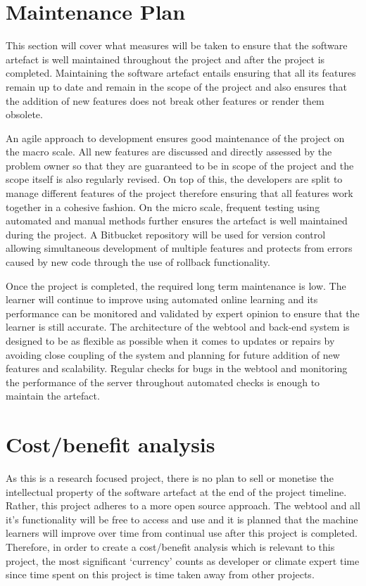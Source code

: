 \documentclass{ecmm427_assignment}
\begin{document}
\section{Maintenance Plan}
This section will cover what measures will be taken to ensure that the software artefact is well maintained throughout the project and after the project is completed. Maintaining the software artefact entails ensuring that all its features remain up to date and remain in the scope of the project and also ensures that the addition of new features does not break other features or render them obsolete.\par

An agile approach to development ensures good maintenance of the project on the macro scale. All new features are discussed and directly assessed by the problem owner so that they are guaranteed to be in scope of the project and the scope itself is also regularly revised. On top of this, the developers are split to manage different features of the project therefore ensuring that all features work together in a cohesive fashion. On the micro scale, frequent testing using automated and manual methods further ensures the artefact is well maintained during the project. A Bitbucket repository will be used for version control allowing simultaneous development of multiple features and protects from errors caused by new code through the use of rollback functionality.\par

Once the project is completed, the required long term maintenance is low. The learner will continue to improve using automated online learning and its performance can be monitored and validated by expert opinion to ensure that the learner is still accurate. The architecture of the webtool and back-end system is designed to be as flexible as possible when it comes to updates or repairs by avoiding close coupling of the system and planning for future addition of new features and scalability. Regular checks for bugs in the webtool and monitoring the performance of the server throughout automated checks is enough to maintain the artefact.

\section{Cost/benefit analysis}
As this is a research focused project, there is no plan to sell or monetise the intellectual property of the software artefact at the end of the project timeline. Rather, this project adheres to a more open source approach. The webtool and all it’s functionality will be free to access and use and it is planned that the machine learners will improve over time from continual use after this project is completed. Therefore, in order to create a cost/benefit analysis which is relevant to this project, the most significant ‘currency’ counts as developer or climate expert time since time spent on this project is time taken away from other projects.
\end{document}
